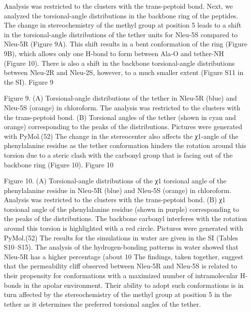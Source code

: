 Analysis was restricted to the clusters with the trans-peptoid bond.
Next, we analyzed the torsional-angle distributions in the backbone ring of the peptides. The change in stereochemistry of the methyl group at position 5 leads to a shift in the torsional-angle distributions of the tether units for Nleu-5S compared to Nleu-5R (Figure 9A). This shift results in a bent conformation of the ring (Figure 9B), which allows only one H-bond to form between Ala-O and tether-NH (Figure 10). There is also a shift in the backbone torsional-angle distributions between Nleu-2R and Nleu-2S, however, to a much smaller extent (Figure S11 in the SI).
Figure 9

Figure 9. (A) Torsional-angle distributions of the tether in Nleu-5R (blue) and Nleu-5S (orange) in chloroform. The analysis was restricted to the clusters with the trans-peptoid bond. (B) Torsional angles of the tether (shown in cyan and orange) corresponding to the peaks of the distributions. Pictures were generated with PyMol.(52) The change in the stereocenter also affects the χ1-angle of the phenylalanine residue as the tether conformation hinders the rotation around this torsion due to a steric clash with the carbonyl group that is facing out of the backbone ring (Figure 10).
Figure 10

Figure 10. (A) Torsional-angle distributions of the χ1 torsional angle of the phenylalanine residue in Nleu-5R (blue) and Nleu-5S (orange) in chloroform. Analysis was restricted to the clusters with the trans-peptoid bond. (B) χ1 torsional angle of the phenylalanine residue (shown in purple) corresponding to the peaks of the distributions. The backbone carbonyl interferes with the rotation around this torsion is highlighted with a red circle. Pictures were generated with PyMol.(52)
The results for the simulations in water are given in the SI (Tables S10–S15). The analysis of the hydrogen-bonding patterns in water showed that Nleu-5R has a higher percentage (about 10%
The findings, taken together, suggest that the permeability cliff observed between Nleu-5R and Nleu-5S is related to their propensity for conformations with a maximized number of intramolecular H-bonds in the apolar environment. Their ability to adopt such conformations is in turn affected by the stereochemistry of the methyl group at position 5 in the tether as it determines the preferred torsional angles of the tether.